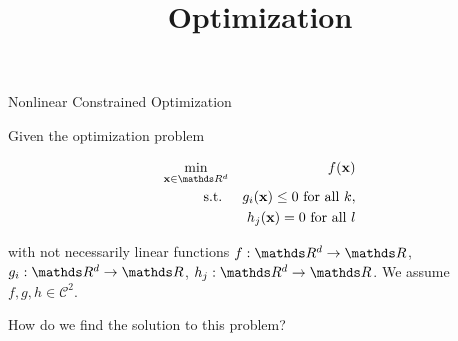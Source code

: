 




\newcommand{\learninggoals}{
\item \textcolor{red}{LEARNING GOAL 1}
\item \textcolor{red}{LEARNING GOAL 1}}



\title{Optimization}



\sloppy

\begin{vbframe}{Nonlinear Constrained Optimization}

Given the optimization problem

\begin{eqnarray*}
 \min_{\xv \in \R^d} && f(\xv) \\
\text{s.t. } && g_i(\xv) \le 0 \text{ for all } k, \\
&& h_j(\xv) = 0 \text{ for all } l
\end{eqnarray*}

with not necessarily linear functions $f:\R^d \to \R$, $g_i:\R^d \to \R$, $h_j:\R^d \to \R$. We assume $f, g, h \in \mathcal{C}^2$. 

\lz 

How do we find the solution to this problem?

\end{vbframe}

